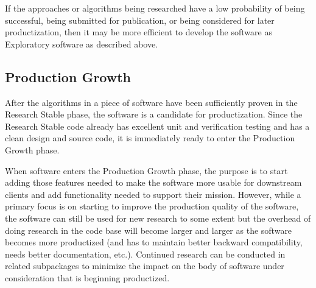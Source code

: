 \documentclass[11pt]{SANDreport}
\begin{document}
If the approaches or algorithms being researched have a low
probability of being successful, being submitted for publication, or
being considered for later productization, then it may be more
efficient to develop the software as Exploratory software as described
above.


%
{}\subsection{Production Growth}
%

After the algorithms in a piece of software have been sufficiently
proven in the Research Stable phase, the software is a candidate 
for productization.  Since the Research Stable code already
has excellent unit and verification testing and has a clean design and
source code, it is immediately ready to enter the Production Growth
phase.

\begin{figure}
\begin{center}
\end{center}
\end{figure}

When software enters the Production Growth phase, the purpose is to
start adding those features needed to make the software more usable
for downstream clients and add functionality needed to support their
mission.  However, while a primary focus is on starting to improve the
production quality of the software, the software can still be used for
new research to some extent but the overhead of doing research in the
code base will become larger and larger as the software becomes more
productized (and has to maintain better backward compatibility,
needs better documentation, etc.).  Continued research can be
conducted in related subpackages to minimize the impact on the body of
software under consideration that is beginning productized.
\end{document}
